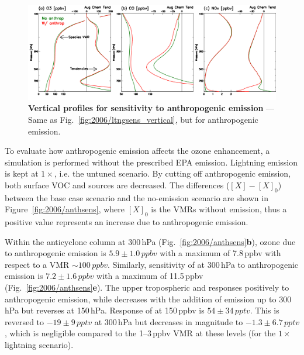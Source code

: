 	\begin{figure}[t!]
		\centering
		\includegraphics[width=1.0\textwidth]{sens/anthsens_vert}
		\caption[Vertical profiles for sensitivity to anthropogenic emission]{\textbf{Vertical profiles for sensitivity to
		anthropogenic emission} --- Same as Fig.~\ref{fig:2006/ltngsens_vertical}, but for anthropogenic emission.
		\label{fig:2006/anthsens_vert} }\vspace{-.3in}
	\end{figure}

To evaluate how anthropogenic emission affects the ozone enhancement, a simulation is performed without the prescribed
EPA emission. Lightning emission is kept at $1\times$, i.e. the untuned scenario. By cutting off anthropogenic emission, both
surface VOC and  sources are decreased. The differences ($[X]-[X]_0$) between the base case scenario and
the no-emission scenario are shown in Figure~\ref{fig:2006/anthsens}, where $[X]_0$ is the VMRs without emission, thus
a positive value represents an increase due to anthropogenic emission.


Within the anticyclone column at 300\,\unit{hPa} (Fig.~\ref{fig:2006/anthsens}{\bf b}), ozone due to anthropogenic emission
is $5.9\pm1.0\,\unit{ppbv}$ with a maximum of 7.8\,\unit{ppbv} with respect to a VMR $\sim100\,\unit{ppbv}$. Similarly,
sensitivity of  at 300\,\unit{hPa} to anthropogenic emission is $7.2\pm1.6\,\unit{ppbv}$ with a maximum of
11.5\,\unit{ppbv} (Fig.~\ref{fig:2006/anthsens}{\bf e}). The upper tropospheric  and  responses
positively to anthropogenic emission, while  decreases with the addition of emission up to 300\,\unit{hPa}
but reverses at 150\,\unit{hPa}. Response of  at 150\,\unit{ppbv} is $54\pm34\,\unit{pptv}$. This is reversed
to $-19\pm9\,\unit{pptv}$ at 300\,\unit{hPa} but decreases in magnitude to $-1.3\pm6.7\,\unit{pptv}$, which is negligible
compared to the 1--3\,\unit{ppbv} VMR at these levels (for the $1\times$ lightning scenario).

